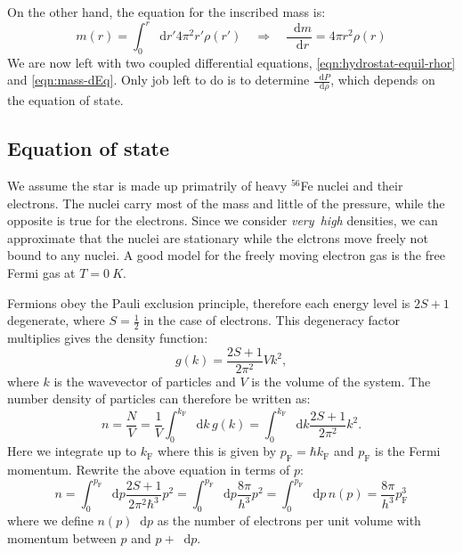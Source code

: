 \documentclass[]{article}
\newcommand{\dd}{\mathop{}\!\mathrm{d}}
\begin{document}
	On the other hand, the equation for the inscribed mass is:
	\begin{equation}\label{eqn:mass-dEq}
		m(r) = \int_0^r \dd r' 4 \pi^2 r' \rho\left(r'\right) \quad \Rightarrow \quad \frac{\dd m}{\dd r} = 4 \pi r^2 \rho(r)
	\end{equation}
	We are now left with two coupled differential equations, \eqref{eqn:hydrostat-equil-rhor} and \eqref{eqn:mass-dEq}. Only job left to do is to determine $\frac{\dd P}{\dd \rho}$, which depends on the equation of state.

\subsection{Equation of state}
	We assume the star is made up primatrily of heavy $^{56}$Fe nuclei and their electrons. The nuclei carry most of the mass and little of the pressure, while the opposite is true for the electrons. Since we consider \emph{very~high} densities, we can approximate that the nuclei are stationary while the elctrons move freely not bound to any nuclei. A good model for the freely moving electron gas is the free Fermi gas at $T = \SI{0}{K}$.

	Fermions obey the Pauli exclusion principle, therefore each energy level is $2S + 1$ degenerate, where $S = \frac{1}{2}$ in the case of electrons. This degeneracy factor multiplies gives the density function:
	\begin{equation}
		g(k) = \frac{2S + 1}{2 \pi^2} V k^2,
	\end{equation}
	where $k$ is the wavevector of particles and $V$ is the volume of the system. The number density of particles can therefore be written as:
	\begin{equation}
		n = \frac{N}{V} = \frac{1}{V} \int_0^{k_\mathrm{F}} \dd k \, g(k) = \int_0^{k_\mathrm{F}} \dd k \frac{2S + 1}{2 \pi^2} k^2.
	\end{equation}
	Here we integrate up to $k_\mathrm{F}$ where this is given by $p_\mathrm{F} = \hbar k_\mathrm{F}$ and $p_\mathrm{F}$ is the Fermi momentum. Rewrite the above equation in terms of $p$:
	\begin{equation}\label{eqn:number-density}
		n = \int_0^{p_\mathrm{F}} \dd p \frac{2S + 1}{2 \pi^2 \hbar^3} p^2 = \int_0^{p_\mathrm{F}} \dd p \frac{8 \pi}{h^3} p^2 = \int_0^{p_\mathrm{F}} \dd p \, n(p) = \frac{8 \pi}{h^3} p_\mathrm{F}^3
	\end{equation}
	where we define $n(p) \dd p$ as the number of electrons per unit volume with momentum between $p$ and $p + \dd p$.
\end{document}
